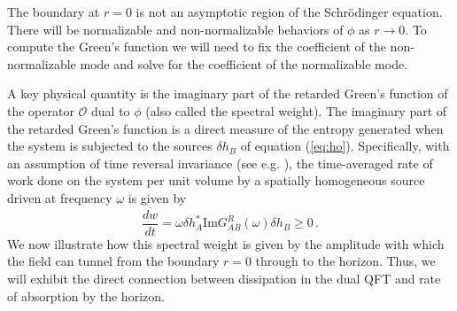 \documentclass[10pt, oneside]{book}
\def\be{\begin{equation}}
\def\ee{\end{equation}}
\def\ocal{{\mathcal{O}}}
\begin{document}
\begin{doublespace}
The boundary at $r=0$ is not an asymptotic region of the Schr\"odinger equation. There will be normalizable and non-normalizable behaviors of $\phi$ as $r \to 0$. To compute the Green's function we will need to fix the coefficient of the non-normalizable mode and solve for the coefficient of the normalizable mode.

A key physical quantity is the imaginary part of the retarded Green's function of the operator $\ocal$ dual to $\phi$ (also called the spectral weight). The imaginary part of the retarded Green's function is a direct measure of the entropy generated when the system is subjected to the sources $\delta h_B$ of equation (\ref{eq:ho}). Specifically, with an assumption of time reversal invariance (see e.g. \cite{Hartnoll:2009sz}), the time-averaged rate of work done on the system per unit volume by a spatially homogeneous source driven at frequency $\omega$ is given by
\be\label{eq:dissip}
\overline{\frac{dw}{dt}} = \omega \delta h^*_A \text{Im} G^R_{AB}(\omega) \delta h_B \geq 0 \,.
\ee
We now illustrate how this spectral weight is given by the amplitude with which the field can tunnel from the boundary $r=0$ through to the horizon. Thus, we will exhibit the direct connection between dissipation in the dual QFT and rate of absorption by the horizon.


\end{doublespace}
\end{document}
